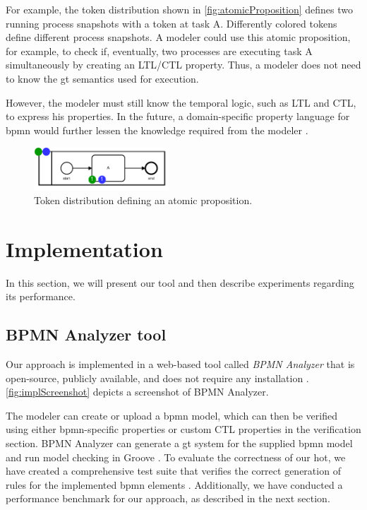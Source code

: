 \documentclass[runningheads]{llncs}
\begin{document}
For example, the token distribution shown in \autoref{fig:atomicProposition} defines two running process snapshots with a token at task A.
Differently colored tokens define different process snapshots.
A modeler could use this atomic proposition, for example, to check if, eventually, two processes are executing task A simultaneously by creating an LTL/CTL property.
Thus, a modeler does not need to know the \gls*{gt} semantics used for execution.

However, the modeler must still know the temporal logic, such as LTL and CTL, to express his properties.
In the future, a domain-specific property language for \gls*{bpmn} would further lessen the knowledge required from the modeler \cite{meyersProMoBoxFrameworkGenerating2014}. 


\begin{figure}[ht]
    \centering
    \includegraphics[width=0.45\textwidth]{images/bpmn_semantics-atomic-proposition.pdf}
    \caption{Token distribution defining an atomic proposition.}
    \label{fig:atomicProposition}
\end{figure}


\section{Implementation} \label{sec:impl}
In this section, we will present our tool and then describe experiments regarding its performance.

\subsection{BPMN Analyzer tool}

Our approach is implemented in a web-based tool called \textit{BPMN Analyzer} that is open-source, publicly available, and does not require any installation \cite{krauterArtifactsICGT2023}.
\autoref{fig:implScreenshot} depicts a screenshot of BPMN Analyzer.

The modeler can create or upload a \gls*{bpmn} model, which can then be verified using either \gls*{bpmn}-specific properties or custom CTL properties in the verification section.
BPMN Analyzer can generate a \gls*{gt} system for the supplied \gls*{bpmn} model and run model checking in Groove \cite{kastenbergModelCheckingDynamic2006}. 
To evaluate the correctness of our \gls*{hot}, we have created a comprehensive test suite that verifies the correct generation of rules for the implemented \gls*{bpmn} elements \cite{krauterArtifactsICGT2023}.
Additionally, we have conducted a performance benchmark for our approach, as described in the next section.
\end{document}
